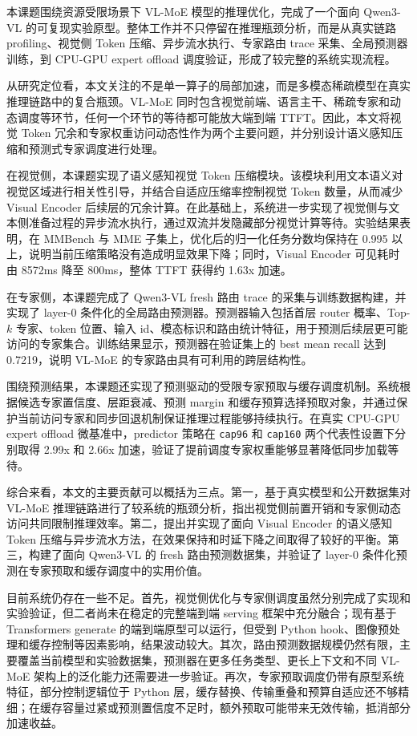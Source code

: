 \begin{conclusion}
本课题围绕资源受限场景下 VL-MoE 模型的推理优化，完成了一个面向 Qwen3-VL 的可复现实验原型。整体工作并不只停留在推理瓶颈分析，而是从真实链路 profiling、视觉侧 Token 压缩、异步流水执行、专家路由 trace 采集、全局预测器训练，到 CPU-GPU expert offload 调度验证，形成了较完整的系统实现流程。

从研究定位看，本文关注的不是单一算子的局部加速，而是多模态稀疏模型在真实推理链路中的复合瓶颈。VL-MoE 同时包含视觉前端、语言主干、稀疏专家和动态调度等环节，任何一个环节的等待都可能放大端到端 TTFT。因此，本文将视觉 Token 冗余和专家权重访问动态性作为两个主要问题，并分别设计语义感知压缩和预测式专家调度进行处理。

在视觉侧，本课题实现了语义感知视觉 Token 压缩模块。该模块利用文本语义对视觉区域进行相关性引导，并结合自适应压缩率控制视觉 Token 数量，从而减少 Visual Encoder 后续层的冗余计算。在此基础上，系统进一步实现了视觉侧与文本侧准备过程的异步流水执行，通过双流并发隐藏部分视觉计算等待。实验结果表明，在 MMBench 与 MME 子集上，优化后的归一化任务分数均保持在 0.995 以上，说明当前压缩策略没有造成明显效果下降；同时，Visual Encoder 可见耗时由 8572ms 降至 800ms，整体 TTFT 获得约 1.63x 加速。

在专家侧，本课题完成了 Qwen3-VL fresh 路由 trace 的采集与训练数据构建，并实现了 layer-0 条件化的全局路由预测器。预测器输入包括首层 router 概率、Top-$k$ 专家、token 位置、输入 id、模态标识和路由统计特征，用于预测后续层更可能访问的专家集合。训练结果显示，预测器在验证集上的 best mean recall 达到 0.7219，说明 VL-MoE 的专家路由具有可利用的跨层结构性。

围绕预测结果，本课题还实现了预测驱动的受限专家预取与缓存调度机制。系统根据候选专家置信度、层距衰减、预测 margin 和缓存预算选择预取对象，并通过保护当前访问专家和同步回退机制保证推理过程能够持续执行。在真实 CPU-GPU expert offload 微基准中，predictor 策略在 \texttt{cap96} 和 \texttt{cap160} 两个代表性设置下分别取得 2.99x 和 2.66x 加速，验证了提前调度专家权重能够显著降低同步加载等待。

综合来看，本文的主要贡献可以概括为三点。第一，基于真实模型和公开数据集对 VL-MoE 推理链路进行了较系统的瓶颈分析，指出视觉侧前置开销和专家侧动态访问共同限制推理效率。第二，提出并实现了面向 Visual Encoder 的语义感知 Token 压缩与异步流水方法，在效果保持和时延下降之间取得了较好的平衡。第三，构建了面向 Qwen3-VL 的 fresh 路由预测数据集，并验证了 layer-0 条件化预测在专家预取和缓存调度中的实用价值。

目前系统仍存在一些不足。首先，视觉侧优化与专家侧调度虽然分别完成了实现和实验验证，但二者尚未在稳定的完整端到端 serving 框架中充分融合；现有基于 Transformers generate 的端到端原型可以运行，但受到 Python hook、图像预处理和缓存控制等因素影响，结果波动较大。其次，路由预测数据规模仍然有限，主要覆盖当前模型和实验数据集，预测器在更多任务类型、更长上下文和不同 VL-MoE 架构上的泛化能力还需要进一步验证。再次，专家预取调度仍带有原型系统特征，部分控制逻辑位于 Python 层，缓存替换、传输重叠和预算自适应还不够精细；在缓存容量过紧或预测置信度不足时，额外预取可能带来无效传输，抵消部分加速收益。


\end{conclusion}
